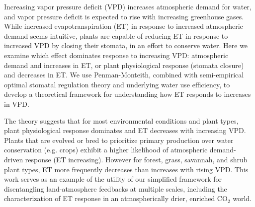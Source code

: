 Increasing vapor pressure deficit (VPD) increases atmospheric demand for
water, and vapor pressure deficit is expected to rise with increasing
greenhouse gases. While increased evapotranspiration (ET) in response to
increased atmospheric demand seems intuitive, plants are capable of
reducing ET in response to increased VPD by closing their stomata, in an
effort to conserve water. Here we examine which effect dominates
response to increasing VPD: atmospheric demand and increases in ET, or
plant physiological response (stomata closure) and decreases in ET. We
use Penman-Monteith, combined with semi-empirical optimal stomatal
regulation theory and underlying water use efficiency, to develop a
theoretical framework for understanding how ET responds to increases in
VPD.

The theory suggests that for most environmental conditions and plant
types, plant physiological response dominates and ET decreases with
increasing VPD. Plants that are evolved or bred to prioritize primary
production over water conservation (e.g. crops) exhibit a higher
likelihood of atmospheric demand-driven response (ET
increasing). However for forest, grass, savannah, and shrub plant types,
ET more frequently decreases than increases with rising VPD. This work
serves as an example of the utility of our simplified framework for
disentangling land-atmosphere feedbacks at multiple scales, including
the characterization of ET response in an atmospherically drier,
enriched CO$_2$ world.
